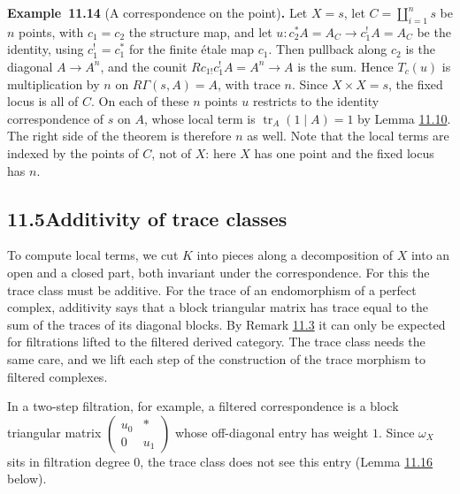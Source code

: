 \documentclass[11pt]{article}
\newenvironment{bpstatement}[2]{\par\addvspace{0.6\baselineskip}\noindent\textbf{#1}#2\textbf{.}\enspace\ignorespaces}
  {\par\addvspace{0.4\baselineskip}}
\begin{document}
\label{bp208}%
\begin{bpstatement}{Example~11.14}{ (A correspondence on the point)}
Let \(X=s\), let \(C=\coprod_{i=1}^ns\) be \(n\) points, with \(c_1=c_2\) the structure map, and let \(u:c_2^*A=A_C\to c_1^!A=A_C\) be the identity, using \(c_1^!=c_1^*\) for the finite étale map \(c_1\). Then pullback along \(c_2\) is the diagonal \(A\to A^n\), and the counit \(Rc_{1!}c_1^!A=A^n\to A\) is the sum. Hence \(T_c(u)\) is multiplication by \(n\) on \(R\Gamma(s,A)=A\), with trace \(n\). Since \(X\times X=s\), the fixed locus is all of \(C\). On each of these \(n\) points \(u\) restricts to the identity correspondence of \(s\) on \(A\), whose local term is \(\operatorname{tr}_A(1\mid A)=1\) by Lemma \hyperref[bp199]{11.10}. The right side of the theorem is therefore \(n\) as well. Note that the local terms are indexed by the points of \(C\), not of \(X\): here \(X\) has one point and the fixed locus has \(n\).
\end{bpstatement}


\subsection*{\texorpdfstring{11.5\quad Additivity of trace classes}{11.5 Additivity of trace classes}}
\label{bp209}%
\label{bp210}%
To compute local terms, we cut \(K\) into pieces along a decomposition of \(X\) into an open and a closed part, both invariant under the correspondence. For this the trace class must be additive. For the trace of an endomorphism of a perfect complex, additivity says that a block triangular matrix has trace equal to the sum of the traces of its diagonal blocks. By Remark \hyperref[bp179]{11.3} it can only be expected for filtrations lifted to the filtered derived category. The trace class needs the same care, and we lift each step of the construction of the trace morphism to filtered complexes.

In a two-step filtration, for example, a filtered correspondence is a block triangular matrix \(\left(\begin{smallmatrix}u_0&*\\0&u_1\end{smallmatrix}\right)\) whose off-diagonal entry has weight \(1\). Since \(\omega_X\) sits in filtration degree \(0\), the trace class does not see this entry (Lemma \hyperref[bp214]{11.16} below).
\end{document}
